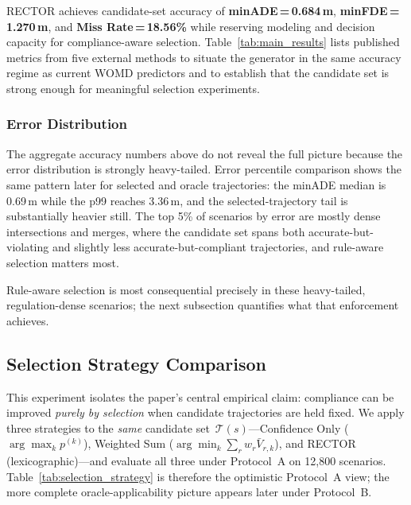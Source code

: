 RECTOR achieves candidate-set accuracy of \textbf{minADE\,=\,0.684\,m}, \textbf{minFDE\,=\,1.270\,m}, and \textbf{Miss Rate\,=\,18.56\%} while reserving modeling and decision capacity for compliance-aware selection.  Table~\ref{tab:main_results} lists published metrics from five external methods to situate the generator in the same accuracy regime as current WOMD predictors and to establish that the candidate set is strong enough for meaningful selection experiments.

\subsubsection{Error Distribution}

The aggregate accuracy numbers above do not reveal the full picture because the error distribution is strongly heavy-tailed. Error percentile comparison shows the same pattern later for selected and oracle trajectories: the minADE median is 0.69\,m while the p99 reaches 3.36\,m, and the selected-trajectory tail is substantially heavier still. The top 5\% of scenarios by error are mostly dense intersections and merges, where the candidate set spans both accurate-but-violating and slightly less accurate-but-compliant trajectories, and rule-aware selection matters most.

Rule-aware selection is most consequential precisely in these heavy-tailed, regulation-dense scenarios; the next subsection quantifies what that enforcement achieves.

\subsection{Selection Strategy Comparison}
\label{subsec:selection_results}

This experiment isolates the paper's central empirical claim: compliance can be improved \emph{purely by selection} when candidate trajectories are held fixed.  We apply three strategies to the \emph{same} candidate set~$\mathcal{T}(s)$---Confidence Only ($\arg\max_k p^{(k)}$), Weighted Sum ($\arg\min_k \sum_r w_r \bar{V}_{r,k}$), and RECTOR (lexicographic)---and evaluate all three under Protocol~A on 12{,}800 scenarios.  Table~\ref{tab:selection_strategy} is therefore the optimistic Protocol~A view; the more complete oracle-applicability picture appears later under Protocol~B.

